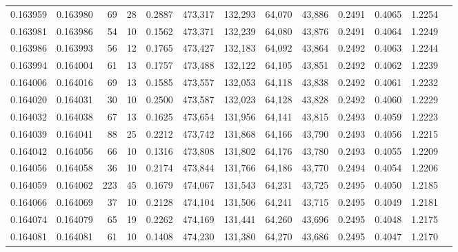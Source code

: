 \begin{tabular}{rrrrrrrrrrrrr}
0.163959 & 0.163980 &    69 &  28 &                                     0.2887 & 473,317 & 132,293 &  64,070 &  43,886 & 0.2491 & 0.4065 & 1.2254 \\
0.163981 & 0.163986 &    54 &  10 &                                     0.1562 & 473,371 & 132,239 &  64,080 &  43,876 & 0.2491 & 0.4064 & 1.2249 \\
0.163986 & 0.163993 &    56 &  12 &                                     0.1765 & 473,427 & 132,183 &  64,092 &  43,864 & 0.2492 & 0.4063 & 1.2244 \\
0.163994 & 0.164004 &    61 &  13 &                                     0.1757 & 473,488 & 132,122 &  64,105 &  43,851 & 0.2492 & 0.4062 & 1.2239 \\
0.164006 & 0.164016 &    69 &  13 &                                     0.1585 & 473,557 & 132,053 &  64,118 &  43,838 & 0.2492 & 0.4061 & 1.2232 \\
0.164020 & 0.164031 &    30 &  10 &                                     0.2500 & 473,587 & 132,023 &  64,128 &  43,828 & 0.2492 & 0.4060 & 1.2229 \\
0.164032 & 0.164038 &    67 &  13 &                                     0.1625 & 473,654 & 131,956 &  64,141 &  43,815 & 0.2493 & 0.4059 & 1.2223 \\
0.164039 & 0.164041 &    88 &  25 &                                     0.2212 & 473,742 & 131,868 &  64,166 &  43,790 & 0.2493 & 0.4056 & 1.2215 \\
0.164042 & 0.164056 &    66 &  10 &                                     0.1316 & 473,808 & 131,802 &  64,176 &  43,780 & 0.2493 & 0.4055 & 1.2209 \\
0.164056 & 0.164058 &    36 &  10 &                                     0.2174 & 473,844 & 131,766 &  64,186 &  43,770 & 0.2494 & 0.4054 & 1.2206 \\
0.164059 & 0.164062 &   223 &  45 &                                     0.1679 & 474,067 & 131,543 &  64,231 &  43,725 & 0.2495 & 0.4050 & 1.2185 \\
0.164066 & 0.164069 &    37 &  10 &                                     0.2128 & 474,104 & 131,506 &  64,241 &  43,715 & 0.2495 & 0.4049 & 1.2181 \\
0.164074 & 0.164079 &    65 &  19 &                                     0.2262 & 474,169 & 131,441 &  64,260 &  43,696 & 0.2495 & 0.4048 & 1.2175 \\
0.164081 & 0.164081 &    61 &  10 &                                     0.1408 & 474,230 & 131,380 &  64,270 &  43,686 & 0.2495 & 0.4047 & 1.2170 \\

\end{tabular}
